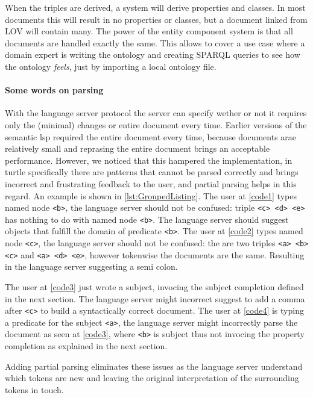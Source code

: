 When the triples are derived, a system will derive properties and classes.
In most documents this will result in no properties or classes, but a document linked from LOV will contain many.
The power of the entity component system is that all documents are handled exactly the same.
This allows to cover a use case where a domain expert is writing the ontology and creating SPARQL queries to see how the ontology \textit{feels}, just by importing a local ontology file.

\paragraph{Some words on parsing}

With the language server protocol the server can specify wether or not it requires only the (minimal) changes or entire document every time.
Earlier versions of the semantic lsp required the entire document every time, because documents arae relatively small and reprasing the entire document brings an acceptable performance.
However, we noticed that this hampered the implementation, in turtle specifically there are patterns that cannot be parsed correctly and brings incorrect and frustrating feedback to the user, and partial parsing helps in this regard.
An example is shown in \ref{lst:GroupedListing}.
  The user at \ref{code1} types named node \texttt{<b>}, the language server should not be confused: triple \texttt{<c> <d> <e>} has nothing to do with named node \texttt{<b>}. The language server should suggest objects that fulfill the domain of predicate \texttt{<b>}. 
  The user at \ref{code2} types named node \texttt{<c>}, the language server should not be confused: the are two triples \texttt{<a> <b> <c>} and \texttt{<a> <d> <e>}, however tokenwise the documents are the same. Resulting in the language server suggesting a semi colon.
  
  The user at \ref{code3} just wrote a subject, invocing the subject completion defined in the next section. The language server might incorrect suggest to add a comma after \texttt{<c>} to build a syntactically correct document.
  The user at \ref{code4} is typing a predicate for the subject \texttt{<a>}, the language server might incorrectly parse the document as seen at \ref{code3}, where \texttt{<b>} is subject thus not invocing the property completion as explained in the next section.

  Adding partial parsing eliminates these issues as the language server understand which tokens are new and leaving the original interpretation of the surrounding tokens in touch.


